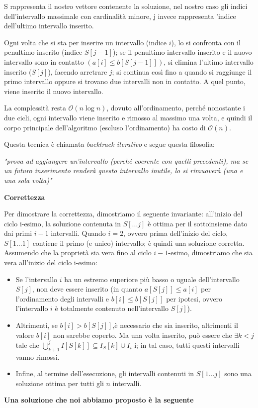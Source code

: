 \documentclass[../cheatSheetAlgoritmi.tex]{subfiles}
\begin{document}
S rappresenta il nostro vettore contenente la soluzione, nel nostro caso gli indici dell'intervallo massimale con cardinalità minore, j invece rappresenta 'indice dell'ultimo intervallo inserito. 

Ogni volta che si sta per inserire un intervallo (indice $i$), lo si confronta con il penultimo inserito (indice $S[j -1]$); se il penultimo intervallo inserito e il nuovo intervallo sono in contatto $(a[i] \leq b[S[j -1]])$, si elimina l'ultimo intervallo inserito ($S[j]$), facendo arretrare $j$; si continua così fino a quando si raggiunge il primo intervallo oppure si trovano due intervalli non in contatto. A quel punto, viene inserito il nuovo intervallo. 

La complessità resta $\mathcal{O}(n \log n)$, dovuto all'ordinamento, perché nonostante i due cicli, ogni intervallo viene inserito e rimosso al massimo una volta, e quindi il corpo principale dell'algoritmo (escluso l'ordinamento) ha costo di $\mathcal{O}(n)$. 

Questa tecnica è chiamata \emph{backtrack iterativo} e segue questa filosofia: 

\emph{"prova ad aggiungere un'intervallo (perché coerente con quelli precedenti), ma se un futuro inserimento renderà questo intervallo inutile, lo si rimuoverà (una e una sola volta)"} 

\textbf{Correttezza} 

Per dimostrare la correttezza, dimostriamo il seguente invariante: all'inizio del ciclo i-esimo, la soluzione contenuta in $S[...j]$ è ottima per il sottoinsieme dato dai primi $i - 1$ intervalli. Quando $i = 2$, ovvero prima dell’inizio del ciclo, $S[1...1]$ contiene il primo (e unico) intervallo; è quindi una soluzione corretta. Assumendo che la proprietà sia vera fino al ciclo $i - 1$-esimo, dimostriamo che sia vera all'inizio del ciclo i-esimo:
\begin{itemize}
	\item Se l'intervallo $i$ ha un estremo superiore più basso o uguale dell'intervallo $S[j]$, non deve essere inserito (in quanto $a[S[j]] \leq a[i]$ per l'ordinamento degli intervalli e $b[i] \leq b[S[j]]$ per ipotesi, ovvero l'intervallo $i$ è totalmente contenuto nell'intervallo $S[j]$).
	\item Altrimenti, se $b[i]> b[S[j]]$,è necessario che sia inserito, altrimenti il valore $b[i]$ non sarebbe coperto. Ma una volta inserito, può essere che $\exists k < j$ tale che $\bigcup^{j}_{k+1} I[S[k]] \subseteq I_S[k] \cup I_i$ i; in tal caso, tutti questi intervalli vanno rimossi.
	\item Infine, al termine dell'esecuzione, gli intervalli contenuti in $S[1. . . j]$ sono una soluzione ottima per tutti gli $n$ intervalli.
\end{itemize}
\textbf{Una soluzione che noi abbiamo proposto è la seguente} 
\end{document}

